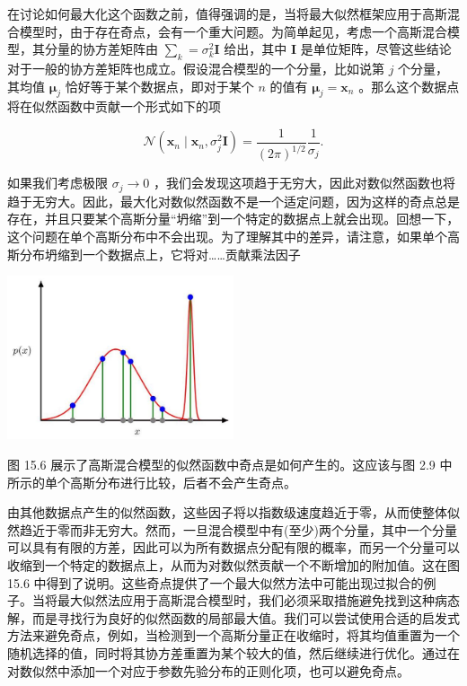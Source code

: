 \documentclass[10pt]{report}
\begin{document}
在讨论如何最大化这个函数之前，值得强调的是，当将最大似然框架应用于高斯混合模型时，由于存在奇点，会有一个重大问题。为简单起见，考虑一个高斯混合模型，其分量的协方差矩阵由 \({\mathbf{\sum }}_{k} = {\sigma }_{k}^{2}\mathbf{I}\) 给出，其中 \(\mathbf{I}\) 是单位矩阵，尽管这些结论对于一般的协方差矩阵也成立。假设混合模型的一个分量，比如说第 \(j\) 个分量，其均值 \({\mathbf{\mu }}_{j}\) 恰好等于某个数据点，即对于某个 \(n\) 的值有 \({\mathbf{\mu }}_{j} = {\mathbf{x}}_{n}\) 。那么这个数据点将在似然函数中贡献一个形式如下的项

\[
\mathcal{N}\left( {{\mathbf{x}}_{n} \mid  {\mathbf{x}}_{n},{\sigma }_{j}^{2}\mathbf{I}}\right)  = \frac{1}{{\left( 2\pi \right) }^{1/2}}\frac{1}{{\sigma }_{j}}. \tag{15.14}
\]

如果我们考虑极限 \({\sigma }_{j} \rightarrow  0\) ，我们会发现这项趋于无穷大，因此对数似然函数也将趋于无穷大。因此，最大化对数似然函数不是一个适定问题，因为这样的奇点总是存在，并且只要某个高斯分量“坍缩”到一个特定的数据点上就会出现。回想一下，这个问题在单个高斯分布中不会出现。为了理解其中的差异，请注意，如果单个高斯分布坍缩到一个数据点上，它将对……贡献乘法因子

\begin{center}
\includegraphics[max width=0.5\textwidth]{images/0194e279-9b28-703a-88f4-c3ac21e2010d_489_899_344_618_447_0.jpg}
\end{center}
\hspace*{3em} 

图 15.6 展示了高斯混合模型的似然函数中奇点是如何产生的。这应该与图 2.9 中所示的单个高斯分布进行比较，后者不会产生奇点。

由其他数据点产生的似然函数，这些因子将以指数级速度趋近于零，从而使整体似然趋近于零而非无穷大。然而，一旦混合模型中有(至少)两个分量，其中一个分量可以具有有限的方差，因此可以为所有数据点分配有限的概率，而另一个分量可以收缩到一个特定的数据点上，从而为对数似然贡献一个不断增加的附加值。这在图 15.6 中得到了说明。这些奇点提供了一个最大似然方法中可能出现过拟合的例子。当将最大似然法应用于高斯混合模型时，我们必须采取措施避免找到这种病态解，而是寻找行为良好的似然函数的局部最大值。我们可以尝试使用合适的启发式方法来避免奇点，例如，当检测到一个高斯分量正在收缩时，将其均值重置为一个随机选择的值，同时将其协方差重置为某个较大的值，然后继续进行优化。通过在对数似然中添加一个对应于参数先验分布的正则化项，也可以避免奇点。
\end{document}
